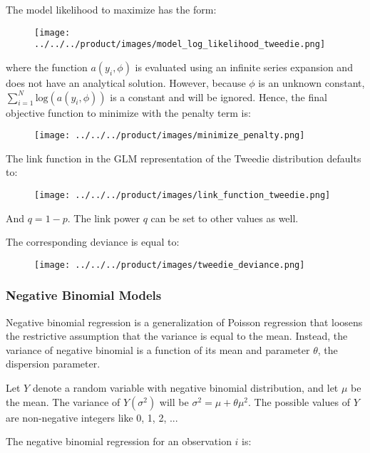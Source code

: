 The model likelihood to maximize has the form:

\begin{figure}[H]
\centering
\texttt{[image: ../../../product/images/model\_log\_likelihood\_tweedie.png]}
\end{figure}

where the function $a(y_i,\phi)$ is evaluated using an infinite series expansion and does not have an analytical solution. However, because $\phi$ is an unknown constant, $\sum_{i=1}^N\text{log}(a(y_i,\phi))$ is a constant and will be ignored. Hence, the final objective function to minimize with the penalty term is:

\begin{figure}[H]
\centering
\texttt{[image: ../../../product/images/minimize\_penalty.png]}
\end{figure}

The link function in the GLM representation of the Tweedie distribution defaults to:

\begin{figure}[H]
\centering
\texttt{[image: ../../../product/images/link\_function\_tweedie.png]}
\end{figure}

And $q = 1 - p$. The link power $q$ can be set to other values as well.

The corresponding deviance is equal to:

\begin{figure}[H]
\centering
\texttt{[image: ../../../product/images/tweedie\_deviance.png]}
\end{figure}
   
\subsubsection{Negative Binomial Models}

Negative binomial regression is a generalization of Poisson regression that loosens the restrictive assumption that the variance is equal to the mean. Instead, the variance of negative binomial is a function of its mean and parameter $\theta$, the dispersion parameter. 

Let $Y$ denote a random variable with negative binomial distribution, and let $\mu$ be the mean. The variance of $Y (\sigma^2)$ will be $\sigma^2 = \mu + \theta\mu^2$. The possible values of $Y$ are non-negative integers like 0, 1, 2, ...

The negative binomial regression for an observation $i$ is:

